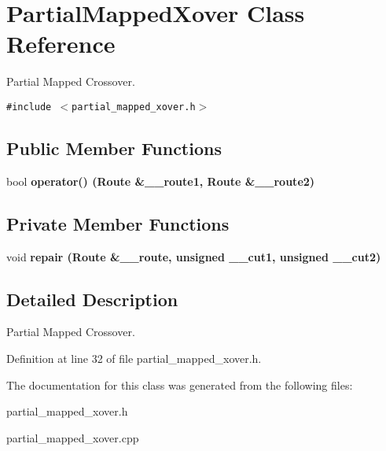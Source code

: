 \section{Partial\-Mapped\-Xover Class Reference}
\label{class_partial_mapped_xover}
Partial Mapped Crossover.  


{\tt \#include $<$partial\_\-mapped\_\-xover.h$>$}

\subsection*{Public Member Functions}
\begin{CompactItemize}
\item 
bool \bf{operator()} (Route \&\_\-\_\-route1, Route \&\_\-\_\-route2)\label{class_partial_mapped_xover_1cda6ea86ca36e5de0125f4ba5cfc695}

\end{CompactItemize}
\subsection*{Private Member Functions}
\begin{CompactItemize}
\item 
void \bf{repair} (Route \&\_\-\_\-route, unsigned \_\-\_\-cut1, unsigned \_\-\_\-cut2)\label{class_partial_mapped_xover_b6d4035544aff3b2b3fe4b0eeea185a2}

\end{CompactItemize}


\subsection{Detailed Description}
Partial Mapped Crossover. 



Definition at line 32 of file partial\_\-mapped\_\-xover.h.

The documentation for this class was generated from the following files:\begin{CompactItemize}
\item 
partial\_\-mapped\_\-xover.h\item 
partial\_\-mapped\_\-xover.cpp\end{CompactItemize}
